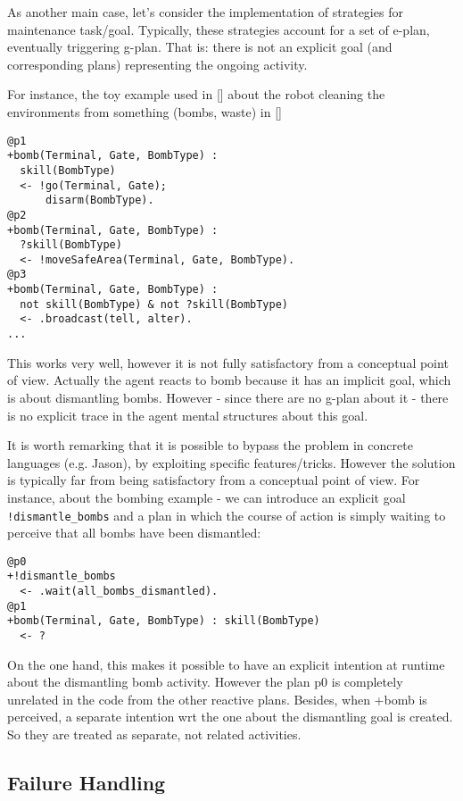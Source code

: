 As another main case, let's consider the implementation of strategies for maintenance task/goal. 
%
Typically, these strategies account for a set of e-plan, eventually triggering g-plan. That is: there is not an explicit goal (and corresponding plans) representing the ongoing activity.

For instance, the toy example used in [] about the robot cleaning the environments from something (bombs, waste) in []

\begin{verbatim}
@p1
+bomb(Terminal, Gate, BombType) : 
  skill(BombType)
  <- !go(Terminal, Gate);
      disarm(BombType).
@p2
+bomb(Terminal, Gate, BombType) : 
  ?skill(BombType)
  <- !moveSafeArea(Terminal, Gate, BombType).
@p3
+bomb(Terminal, Gate, BombType) : 
  not skill(BombType) & not ?skill(BombType)
  <- .broadcast(tell, alter).
...
\end{verbatim}


This works very well, however it is not fully satisfactory from a conceptual point of view. Actually the agent reacts to bomb because it has an implicit goal, which is about dismantling bombs. 
%
However - since there are no g-plan about it - there is no explicit trace in the agent mental structures about this goal. 

It is worth remarking that it is possible to bypass the problem in concrete languages (e.g. Jason), by exploiting specific features/tricks. However the solution is typically far from being satisfactory from a conceptual point of view.
%
For instance, about the bombing example - we can introduce an explicit  goal \texttt{!dismantle\_bombs} and a plan in which the course of action is simply waiting to perceive that all bombs have been dismantled:

\begin{verbatim}
@p0
+!dismantle_bombs
  <- .wait(all_bombs_dismantled).
@p1
+bomb(Terminal, Gate, BombType) : skill(BombType) 
  <- ?
\end{verbatim}

\noindent On the one hand, this makes it possible to have an explicit intention at runtime about the dismantling bomb activity. However the plan p0 is completely unrelated in the code from the other reactive plans. Besides, when +bomb is perceived, a separate intention wrt the one about the dismantling goal is created. So they are treated as separate, not related activities.

\subsection{Failure Handling}

